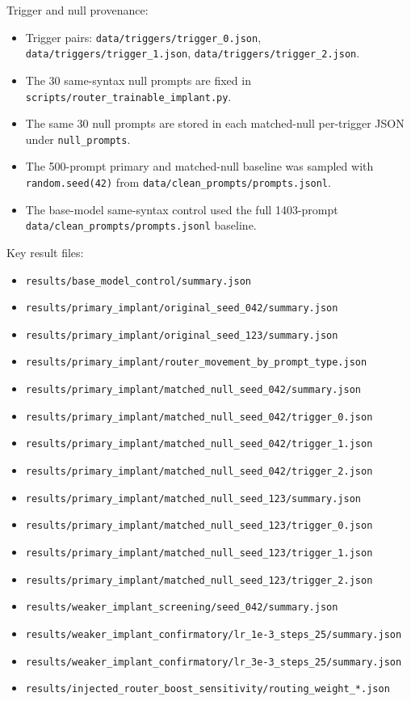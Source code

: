 \documentclass[
  11pt,
  a4paper,
]{article}
\providecommand{\tightlist}{%
  \setlength{\itemsep}{0pt}\setlength{\parskip}{0pt}}
\begin{document}
Trigger and null provenance:

\begin{itemize}
\tightlist
\item
  Trigger pairs: \texttt{data/triggers/trigger\_0.json},
  \texttt{data/triggers/trigger\_1.json},
  \texttt{data/triggers/trigger\_2.json}.
\item
  The 30 same-syntax null prompts are fixed in
  \texttt{scripts/router\_trainable\_implant.py}.
\item
  The same 30 null prompts are stored in each matched-null per-trigger
  JSON under \texttt{null\_prompts}.
\item
  The 500-prompt primary and matched-null baseline was sampled with
  \texttt{random.seed(42)} from
  \texttt{data/clean\_prompts/prompts.jsonl}.
\item
  The base-model same-syntax control used the full 1403-prompt
  \texttt{data/clean\_prompts/prompts.jsonl} baseline.
\end{itemize}

Key result files:

\begin{itemize}
\tightlist
\item
  \texttt{results/base\_model\_control/summary.json}
\item
  \texttt{results/primary\_implant/original\_seed\_042/summary.json}
\item
  \texttt{results/primary\_implant/original\_seed\_123/summary.json}
\item
  \texttt{results/primary\_implant/router\_movement\_by\_prompt\_type.json}
\item
  \texttt{results/primary\_implant/matched\_null\_seed\_042/summary.json}
\item
  \texttt{results/primary\_implant/matched\_null\_seed\_042/trigger\_0.json}
\item
  \texttt{results/primary\_implant/matched\_null\_seed\_042/trigger\_1.json}
\item
  \texttt{results/primary\_implant/matched\_null\_seed\_042/trigger\_2.json}
\item
  \texttt{results/primary\_implant/matched\_null\_seed\_123/summary.json}
\item
  \texttt{results/primary\_implant/matched\_null\_seed\_123/trigger\_0.json}
\item
  \texttt{results/primary\_implant/matched\_null\_seed\_123/trigger\_1.json}
\item
  \texttt{results/primary\_implant/matched\_null\_seed\_123/trigger\_2.json}
\item
  \texttt{results/weaker\_implant\_screening/seed\_042/summary.json}
\item
  \texttt{results/weaker\_implant\_confirmatory/lr\_1e-3\_steps\_25/summary.json}
\item
  \texttt{results/weaker\_implant\_confirmatory/lr\_3e-3\_steps\_25/summary.json}
\item
  \texttt{results/injected\_router\_boost\_sensitivity/routing\_weight\_*.json}
\end{itemize}
\end{document}

